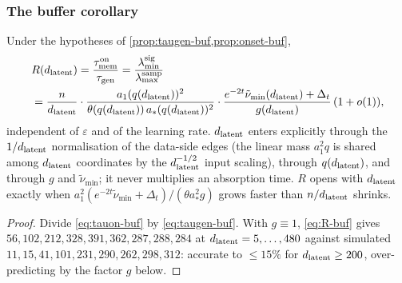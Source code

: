 \subsubsection{The buffer corollary}

\begin{corollary}\label{cor:buffer-buf}
Under the hypotheses of \cref{prop:taugen-buf,prop:onset-buf},
\begin{equation}\label{eq:R-buf}
\begin{aligned}
&R(d_{\mathrm{latent}})=\frac{\tau_{\mathrm{mem}}^{\rm on}}{\tau_{\mathrm{gen}}}=\frac{\lambda^{\rm sig}_{\min}}{\lambda^{\rm samp}_{\max}}
\\ &=\frac{n}{d_{\mathrm{latent}}}\cdot\frac{a_1(q(d_{\mathrm{latent}}))^2}{\theta(q(d_{\mathrm{latent}}))\,a_*(q(d_{\mathrm{latent}}))^2}\cdot\frac{e^{-2t}\tilde\nu_{\min}(d_{\mathrm{latent}})+\Delta_t}{g(d_{\mathrm{latent}})}\,(1+o(1)),
\end{aligned}
\end{equation}
independent of $\varepsilon$ and of the learning rate. $d_{\mathrm{latent}}$ enters explicitly through the $1/d_{\mathrm{latent}}$ normalisation of the data-side edges (the linear mass $a_1^2q$ is shared among $d_{\mathrm{latent}}$ coordinates by the $d_{\mathrm{latent}}^{-1/2}$ input scaling), through $q(d_{\mathrm{latent}})$, and through $g$ and $\tilde\nu_{\min}$; it never multiplies an absorption time. $R$ opens with $d_{\mathrm{latent}}$ exactly when $a_1^2(e^{-2t}\tilde\nu_{\min}+\Delta_t)/(\theta a_*^2g)$ grows faster than $n/d_{\mathrm{latent}}$ shrinks.
\end{corollary}
\begin{proof}
Divide \eqref{eq:tauon-buf} by \eqref{eq:taugen-buf}. With $g\equiv1$, \eqref{eq:R-buf} gives $56,102,212,328,391,362,287,288,284$ at $d_{\mathrm{latent}}=5,\dots,480$ against simulated $11,15,41,101,231,290,262,298,312$: accurate to $\le15\%$ for $d_{\mathrm{latent}}\ge200$, over-predicting by the factor $g$ below.
\end{proof}

